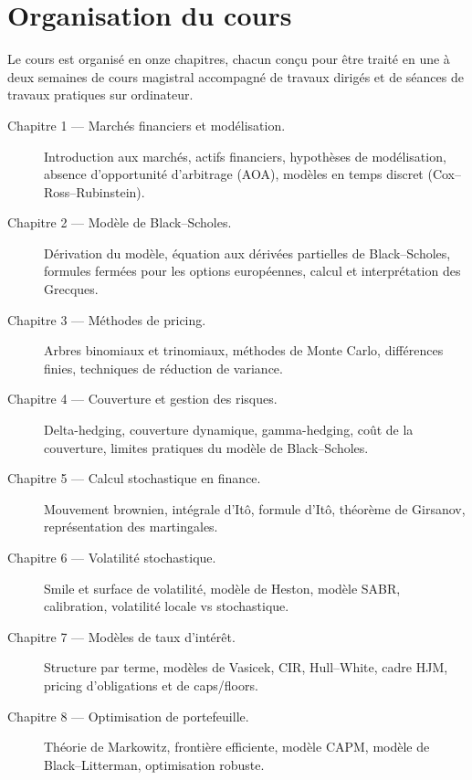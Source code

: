 \section*{Organisation du cours}

Le cours est organis\'e en onze chapitres, chacun con\c{c}u pour \^etre
trait\'e en une \`a deux semaines de cours magistral accompagn\'e de
travaux dirig\'es et de s\'eances de travaux pratiques sur ordinateur.

\begin{description}
    \item[Chapitre 1 --- March\'es financiers et mod\'elisation.]
        Introduction aux march\'es, actifs financiers, hypoth\`eses de
        mod\'elisation, absence d'opportunit\'e d'arbitrage (AOA),
        mod\`eles en temps discret (Cox--Ross--Rubinstein).

    \item[Chapitre 2 --- Mod\`ele de Black--Scholes.]
        D\'erivation du mod\`ele, \'equation aux d\'eriv\'ees partielles
        de Black--Scholes, formules ferm\'ees pour les options europ\'eennes,
        calcul et interpr\'etation des Grecques.

    \item[Chapitre 3 --- M\'ethodes de pricing.]
        Arbres binomiaux et trinomiaux, m\'ethodes de Monte Carlo,
        diff\'erences finies, techniques de r\'eduction de variance.

    \item[Chapitre 4 --- Couverture et gestion des risques.]
        Delta-hedging, couverture dynamique, gamma-hedging, co\^ut
        de la couverture, limites pratiques du mod\`ele de Black--Scholes.

    \item[Chapitre 5 --- Calcul stochastique en finance.]
        Mouvement brownien, int\'egrale d'It\^o, formule d'It\^o,
        th\'eor\`eme de Girsanov, repr\'esentation des martingales.

    \item[Chapitre 6 --- Volatilit\'e stochastique.]
        Smile et surface de volatilit\'e, mod\`ele de Heston, mod\`ele
        SABR, calibration, volatilit\'e locale vs stochastique.

    \item[Chapitre 7 --- Mod\`eles de taux d'int\'er\^et.]
        Structure par terme, mod\`eles de Vasicek, CIR, Hull--White,
        cadre HJM, pricing d'obligations et de caps/floors.

    \item[Chapitre 8 --- Optimisation de portefeuille.]
        Th\'eorie de Markowitz, fronti\`ere efficiente, mod\`ele CAPM,
        mod\`ele de Black--Litterman, optimisation robuste.


\end{description}

